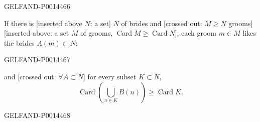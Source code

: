 \begin{GelfandAdjacentEvidence}{GELFAND-P001446}{6}


If there is [inserted above \(N\): a set] \(N\) of brides and [crossed out: \(M\geq N\) grooms] [inserted above: a set \(M\) of grooms, \(\operatorname{Card}M\geq\operatorname{Card}N\)], each groom \(m\in M\) likes the brides \(A(m)\subset N\);
\end{GelfandAdjacentEvidence}
\begin{GelfandAdjacentEvidence}{GELFAND-P001446}{7}


and [crossed out: \(\forall A\subset N\)] for every subset \(K\subset N\),
\[
\operatorname{Card}\left(\bigcup_{n\in K}B(n)\right)
\geq \operatorname{Card}K.
\]
\end{GelfandAdjacentEvidence}
\begin{GelfandAdjacentEvidence}{GELFAND-P001446}{8}

\end{GelfandAdjacentEvidence}



